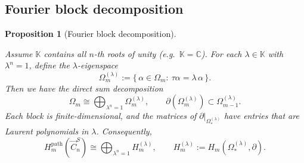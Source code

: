 \documentclass[11pt]{amsart}
\newcommand{\K}{\mathbb K}
\theoremstyle{plain}
\newtheorem{proposition}[theorem]{Proposition}
\theoremstyle{definition}
\numberwithin{equation}{section}
\begin{document}
\subsection{Fourier block decomposition}\label{sub:Fourier}

\begin{proposition}[Fourier block decomposition]\label{prop:Fourier}

Assume $\K$ contains all $n$-th roots of unity (e.g.\ $\K=\mathbb C$). For each $\lambda\in\K$ with $\lambda^n=1$, define the
$\lambda$-eigenspace
\[
\Omega_m^{(\lambda)}:=\{\,\alpha\in \Omega_m:\ \tau\alpha=\lambda\,\alpha\,\}.
\]
Then we have the direct sum decomposition
\begin{equation}\label{eq:fourier-split}
\Omega_m \cong \bigoplus_{\lambda^n=1} \Omega_m^{(\lambda)},\qquad
\partial(\Omega_m^{(\lambda)})\subset \Omega_{m-1}^{(\lambda)}.
\end{equation}
Each block is finite-dimensional, and the matrices of $\partial\big|_{\Omega_{*}^{(\lambda)}}$ have entries that are Laurent polynomials in $\lambda$. Consequently,
\begin{equation}\label{eq:homology-split}
H_m^{\mathrm{path}}(\vec{C}_n^S) \cong \bigoplus_{\lambda^n=1} H_m^{(\lambda)},\qquad
H_m^{(\lambda)}:=H_m(\Omega_*^{(\lambda)},\partial).
\end{equation}
\end{proposition}
\end{document}
